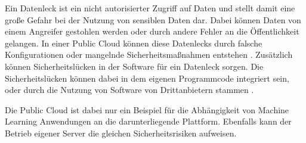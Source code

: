 Ein Datenleck ist ein nicht autorisierter Zugriff auf Daten und stellt damit eine große Gefahr bei der Nutzung von sensiblen Daten dar.
Dabei können Daten von einem Angreifer gestohlen werden oder durch andere Fehler an die Öffentlichkeit gelangen.
In einer Public Cloud können diese Datenlecks durch falsche Konfigurationen oder mangelnde Sicherheitsmaßnahmen entstehen \cite{neumann}.
Zusätzlich können Sicherheitslücken in der Software für ein Datenleck sorgen.
Die Sicherheitslücken können dabei in dem eigenen Programmcode integriert sein, oder durch die Nutzung von Software von Drittanbietern stammen \cite{neumann}.

Die Public Cloud ist dabei nur ein Beispiel für die Abhängigkeit von Machine Learning Anwendungen an die darunterliegende Plattform.
Ebenfalls kann der Betrieb eigener Server die gleichen Sicherheitsrisiken aufweisen.
